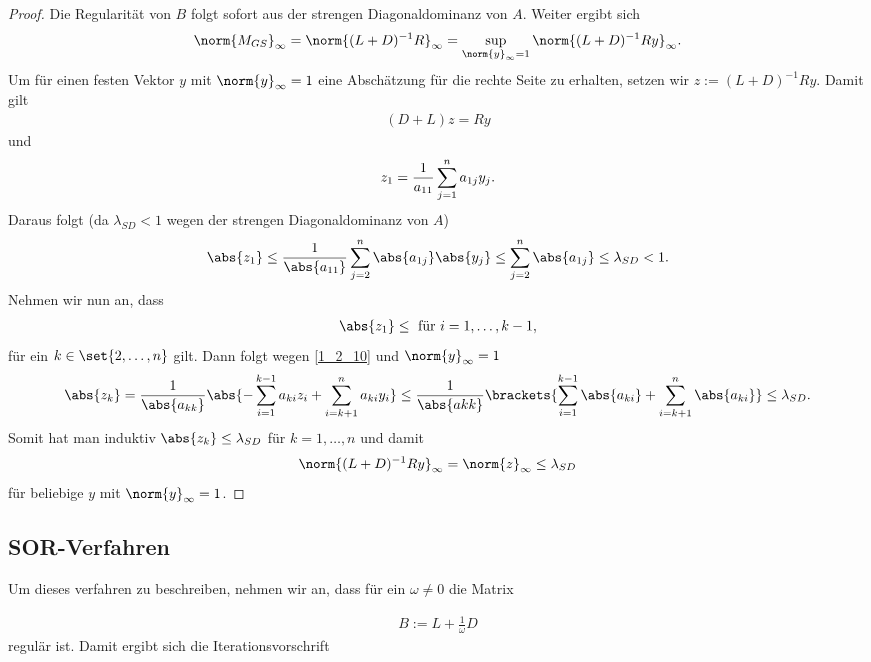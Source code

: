 \begin{proof}
	Die Regularität von $B$ folgt sofort aus der strengen Diagonaldominanz von $A$. Weiter ergibt sich
	\begin{align}
		\norm{M_{GS}}_{\infty} = \norm{(L+D)^{-1}R}_{\infty} = \sup_{\norm{y}_{\infty}=1} \norm{(L+D)^{-1}Ry}_{\infty}. \notag
	\end{align}
	Um für einen festen Vektor $y$ mit $\norm{y}_{\infty} = 1$ eine Abschätzung für die rechte Seite zu erhalten, setzen wir $z:= (L+D)^{-1}Ry$. Damit gilt
	\begin{align}
		(D+L)z = Ry \label{1_2_10}
	\end{align}
	und
	\begin{align}
	z_1 = \frac{1}{a_{11}} \sum_{j=1}^{n} a_{1j}y_j. \notag
	\end{align}
	Daraus folgt (da $\lambda_{SD} < 1$ wegen der strengen Diagonaldominanz von $A$)
	\begin{align}
		\abs{z_1} 
		\le \frac{1}{\abs{a_{11}}} \sum_{j=2}^{n} \abs{a_{1j}}\abs{y_j} 
		\le \sum_{j=2}^{n} \abs{a_{1j}} \le \lambda_{SD} < 1.\notag
	\end{align}
	Nehmen wir nun an, dass
	\begin{align}
		\abs{z_1} \le \text{ für } i = 1, \dots, k-1, \notag
	\end{align}
	für ein $k \in \set{2,\dots,n}$ gilt. Dann folgt wegen \eqref{1_2_10} und $\norm{y}_{\infty} = 1$
	\begin{align}
		\abs{z_k} = \frac{1}{\abs{a_{kk}}} \abs{-\sum_{i=1}^{k-1} a_{ki}z_i + \sum_{i=k+1}^{n} a_{ki}y_i} 
		\le \frac{1}{\abs{a{kk}}} \brackets{\sum_{i=1}^{k-1} \abs{a_{ki}} + \sum_{i=k+1}^{n} \abs{a_{ki}}} \le \lambda_{SD}. \notag
	\end{align}
	Somit hat man induktiv $\abs{z_k} \le \lambda_{SD}$ für $k = 1, \dots, n$ und damit
	\begin{align}
		\norm{(L+D)^{-1}Ry}_{\infty} = \norm{z}_{\infty} \le \lambda_{SD} \notag
	\end{align}
	für beliebige $y$ mit $\norm{y}_{\infty} = 1$.
\end{proof}

\subsection{SOR-Verfahren}

Um dieses verfahren zu beschreiben, nehmen wir an, dass für ein $\omega \neq 0$ die Matrix

\begin{align}
	B:=L + \frac{1}{\omega}D \label{eq_2_2_11}
\end{align}
regulär ist. Damit ergibt sich die Iterationsvorschrift


